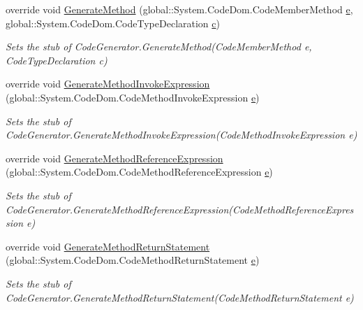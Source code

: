 \begin{DoxyCompactItemize}
override void \hyperlink{class_system_1_1_code_dom_1_1_compiler_1_1_fakes_1_1_stub_code_generator_aea89e8892c8a4ae8e86e8eaf29077fa1}{Generate\-Method} (global\-::\-System.\-Code\-Dom.\-Code\-Member\-Method \hyperlink{jquery-1_810_82_8min_8js_a2c038346d47955cbe2cb91e338edd7e1}{e}, global\-::\-System.\-Code\-Dom.\-Code\-Type\-Declaration \hyperlink{bootstrap_8min_8js_abce695e0af988ece0826d9ad59b8160d}{c})
\begin{DoxyCompactList}\small\item\em Sets the stub of Code\-Generator.\-Generate\-Method(\-Code\-Member\-Method e, Code\-Type\-Declaration c)\end{DoxyCompactList}\item 
override void \hyperlink{class_system_1_1_code_dom_1_1_compiler_1_1_fakes_1_1_stub_code_generator_a823f4544e90e585cd3e5bbc83de0237b}{Generate\-Method\-Invoke\-Expression} (global\-::\-System.\-Code\-Dom.\-Code\-Method\-Invoke\-Expression \hyperlink{jquery-1_810_82_8min_8js_a2c038346d47955cbe2cb91e338edd7e1}{e})
\begin{DoxyCompactList}\small\item\em Sets the stub of Code\-Generator.\-Generate\-Method\-Invoke\-Expression(\-Code\-Method\-Invoke\-Expression e)\end{DoxyCompactList}\item 
override void \hyperlink{class_system_1_1_code_dom_1_1_compiler_1_1_fakes_1_1_stub_code_generator_a0ccd6df6f04a27be16e6a4e7e9e2e519}{Generate\-Method\-Reference\-Expression} (global\-::\-System.\-Code\-Dom.\-Code\-Method\-Reference\-Expression \hyperlink{jquery-1_810_82_8min_8js_a2c038346d47955cbe2cb91e338edd7e1}{e})
\begin{DoxyCompactList}\small\item\em Sets the stub of Code\-Generator.\-Generate\-Method\-Reference\-Expression(\-Code\-Method\-Reference\-Expression e)\end{DoxyCompactList}\item 
override void \hyperlink{class_system_1_1_code_dom_1_1_compiler_1_1_fakes_1_1_stub_code_generator_a812521906c66257c1e9fac0fb3c65838}{Generate\-Method\-Return\-Statement} (global\-::\-System.\-Code\-Dom.\-Code\-Method\-Return\-Statement \hyperlink{jquery-1_810_82_8min_8js_a2c038346d47955cbe2cb91e338edd7e1}{e})
\begin{DoxyCompactList}\small\item\em Sets the stub of Code\-Generator.\-Generate\-Method\-Return\-Statement(\-Code\-Method\-Return\-Statement e)\end{DoxyCompactList}\item 

\end{DoxyCompactItemize}
